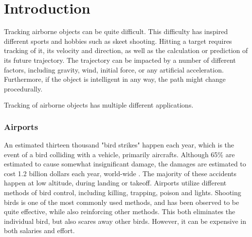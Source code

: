 
\chapter{Introduction}

Tracking airborne objects can be quite difficult.
This difficulty has inspired different sports and hobbies such as skeet shooting.
Hitting a target requires tracking of it, its velocity and direction, as well as the calculation or prediction of its future trajectory.
The trajectory can be impacted by a number of different factors, including gravity, wind, initial force, or any artificial acceleration.
Furthermore, if the object is intelligent in any way, the path might change procedurally.

Tracking of airborne objects has multiple different applications.

\subsection{Airports}
An estimated thirteen thousand "bird strikes" happen each year, which is the event of a bird colliding with a vehicle, primarily aircrafts\cite{WikiBirdStrike}\cite{WildlifeStrikeReport}.
Although 65\% are estimated to cause somewhat insignificant damage, the damages are estimated to cost 1.2 billion dollars each year, world-wide \cite{CostOfBirdstrikes}.
The majority of these accidents happen at low altitude, during landing or takeoff\cite{CostOfBirdstrikes}.
Airports utilize different methods of bird control, including killing, trapping, poison and lights\cite{BirdControlAtAirports}.
Shooting birds is one of the most commonly used methods, and has been observed to be quite effective, while also reinforcing other methods.
This both eliminates the individual bird, but also scares away other birds.
However, it can be expensive in both salaries and effort.

